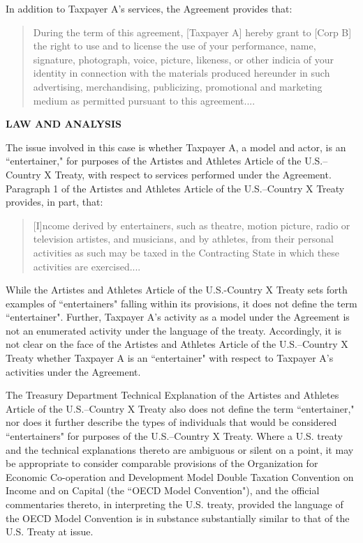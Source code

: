 \begin{select}
In addition to Taxpayer A's services, the Agreement provides that:
\begin{quotation}
During the term of this agreement, [Taxpayer A] hereby grant to [Corp B] the
right to use and to license the use of your performance, name, signature,
photograph, voice, picture, likeness, or other indicia of your identity in
connection with the materials produced hereunder in such advertising,
merchandising, publicizing, promotional and marketing medium as permitted
pursuant to this agreement....
\end{quotation}

\begin{center}\textbf{LAW AND ANALYSIS}
\end{center}
The issue involved in this case is whether Taxpayer A, a model and actor, is
an ``entertainer," for purposes of the Artistes and Athletes Article of the U.S.--Country X Treaty, with respect to services performed under the Agreement. 
Paragraph 1 of the Artistes and Athletes Article of the U.S.--Country X Treaty
provides, in part, that:
\begin{quotation}
[I]ncome derived by entertainers, such as theatre, motion picture, radio or
television artistes, and musicians, and by athletes, from their personal
activities as such may be taxed in the Contracting State in which these
activities are exercised....
\end{quotation}
While the Artistes and Athletes Article of the U.S.-Country X Treaty sets forth
examples of ``entertainers" falling within its provisions, it does not define the term
``entertainer". Further, Taxpayer A's activity as a model under the Agreement is not
an enumerated activity under the language of the treaty. Accordingly, it is not clear
on the face of the Artistes and Athletes Article of the U.S.--Country X Treaty whether
Taxpayer A is an ``entertainer" with respect to Taxpayer A's activities under the
Agreement. 

The Treasury Department Technical Explanation of the Artistes and Athletes
Article of the U.S.--Country X Treaty also does not define the term ``entertainer," nor
does it further describe the types of individuals that would be considered
``entertainers" for purposes of the U.S.--Country X Treaty. Where a U.S. treaty and
the technical explanations thereto are ambiguous or silent on a point, it may be
appropriate to consider comparable provisions of the Organization for Economic
Co-operation and Development Model Double Taxation Convention on Income and
on Capital (the ``OECD Model Convention"), and the official commentaries thereto,
in interpreting the U.S. treaty, provided the language of the OECD Model
Convention is in substance substantially similar to that of the U.S. Treaty at issue. 


\end{select}
